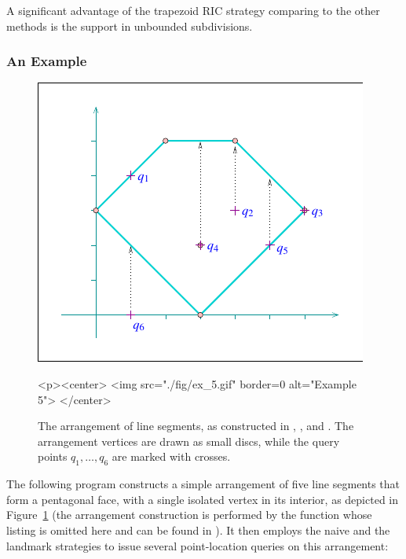 A significant advantage of the trapezoid RIC strategy 
comparing to the other methods
is the support in unbounded subdivisions.

\subsubsection{An Example\label{arr_sssec:pl_ex}}

\begin{figure}[t]
\begin{ccTexOnly}
  \begin{center}
  \includegraphics{Arrangement_on_surface_2/fig/ex_5}
  \end{center}
\end{ccTexOnly}
\begin{ccHtmlOnly}
  <p><center>
  <img src="./fig/ex_5.gif" border=0 alt="Example 5">
  </center>
\end{ccHtmlOnly}
\caption{The arrangement of line segments, as constructed in
, , and
. The
arrangement vertices are drawn as small discs, while the query
points $q_1, \ldots, q_6$ are marked with crosses.\label{arr_fig:ex_5}}
\end{figure}

The following program constructs a simple arrangement of five line
segments that form a pentagonal face, with a single isolated
vertex in its interior, as depicted in Figure~\ref{arr_fig:ex_5}
(the arrangement construction is performed by the function
 whose listing is omitted here and
can be found in ).
It then employs the naive and the landmark strategies to issue
several point-location queries on this arrangement:

